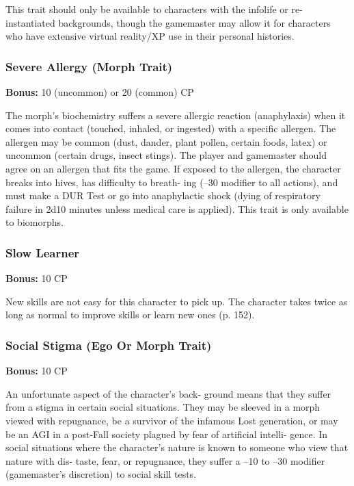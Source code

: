 This trait should only be available to characters 
with the infolife or re-instantiated backgrounds, 
though the gamemaster may allow it for characters 
who have extensive virtual reality/XP use in their 
personal histories.

\subsubsection{Severe Allergy (Morph Trait)}

\textbf{Bonus:} 10 (uncommon) or 20 (common) CP

The morph's biochemistry suffers a severe allergic 
reaction (anaphylaxis) when it comes into contact 
(touched, inhaled, or ingested) with a specific allergen. 
The allergen may be common (dust, dander, plant pollen, 
certain foods, latex) or uncommon (certain drugs, insect 
stings). The player and gamemaster should agree on an 
allergen that fits the game. If exposed to the allergen, 
the character breaks into hives, has difficulty to breath-
ing (–30 modifier to all actions), and must make a DUR 
Test or go into anaphylactic shock (dying of respiratory 
failure in 2d10 minutes unless medical care is applied). 
This trait is only available to biomorphs.

\subsubsection{Slow Learner}

\textbf{Bonus:} 10 CP

New skills are not easy for this character to pick 
up. The character takes twice as long as normal to 
improve skills or learn new ones (p. 152).

\subsubsection{Social Stigma (Ego Or Morph Trait)}

\textbf{Bonus:} 10 CP

An unfortunate aspect of the character's back-
ground means that they suffer from a stigma in 
certain social situations. They may be sleeved in 
a morph viewed with repugnance, be a survivor of 
the infamous Lost generation, or may be an AGI in 
a post-Fall society plagued by fear of artificial intelli-
gence. In social situations where the character's nature 
is known to someone who view that nature with dis-
taste, fear, or repugnance, they suffer a –10 to –30 
modifier (gamemaster's discretion) to social skill tests.

